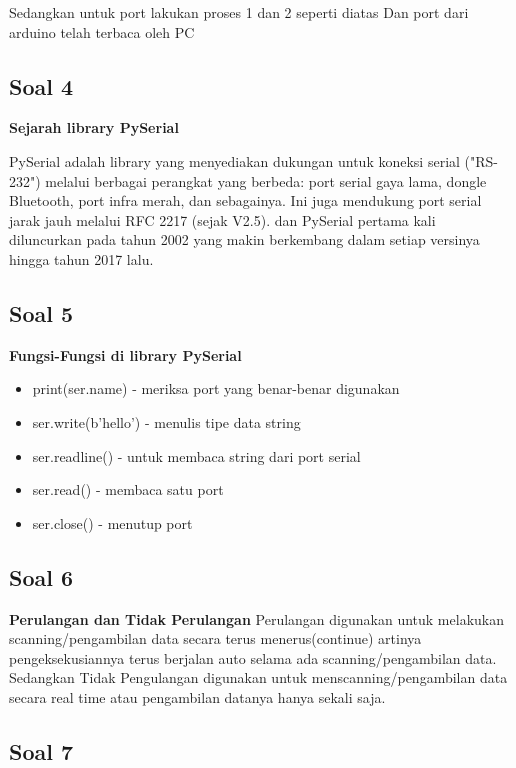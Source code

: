 \begin{itemize}
Sedangkan untuk port
lakukan proses 1 dan 2 seperti diatas
Dan port dari arduino telah terbaca oleh PC
	
\subsection{Soal 4}

\textbf{Sejarah library PySerial}

	PySerial adalah library yang menyediakan dukungan untuk koneksi serial ("RS-232") melalui berbagai perangkat yang berbeda: port serial gaya lama, dongle Bluetooth, port infra merah, dan sebagainya. Ini juga mendukung port serial jarak jauh melalui RFC 2217 (sejak V2.5). dan PySerial pertama kali diluncurkan pada tahun 2002 yang makin berkembang dalam setiap versinya hingga tahun 2017 lalu.

\subsection{Soal 5}

\textbf{Fungsi-Fungsi di library PySerial}
\begin{itemize}
\item print(ser.name)         - meriksa port yang benar-benar digunakan
\item ser.write(b'hello')     	- menulis tipe data string
\item ser.readline()  	- untuk membaca string dari port serial
\item  ser.read()         	 - membaca satu port
\item ser.close()         	- menutup port
\end{itemize}

\subsection{Soal 6}

\textbf{Perulangan dan Tidak Perulangan}
	Perulangan digunakan untuk melakukan scanning/pengambilan data secara terus menerus(continue) artinya pengeksekusiannya terus berjalan auto selama ada scanning/pengambilan data. Sedangkan Tidak Pengulangan digunakan untuk menscanning/pengambilan data secara real time atau pengambilan datanya hanya sekali saja.


\subsection{Soal 7}


\end{itemize}
